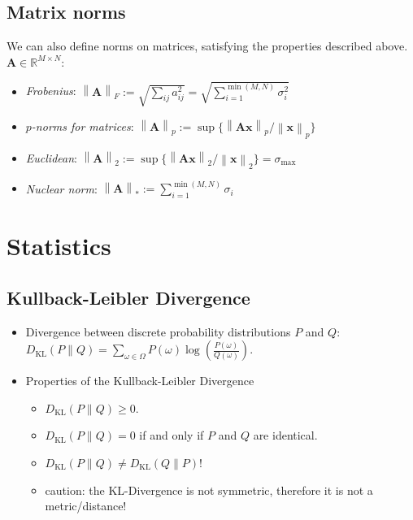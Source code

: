 \documentclass[11pt,a4paper,technote]{IEEEtran}
\newcommand{\norm}[1]{\left\lVert#1\right\rVert}
\newcommand{\matr}[1]{\boldsymbol{\mathbf{#1}}}
\newcommand{\vect}[1]{\boldsymbol{\mathbf{#1}}}
\newcommand{\R}{\mathbb{R}}
\begin{document}
\subsection*{Matrix norms}
We can also define norms on matrices, satisfying the properties described
above. $\matr{A} \in \R^{M \times N}$:
\begin{itemize}
  \item \emph{Frobenius}:
    \(
      \norm{\matr{A}}_F := \sqrt{\sum_{ij} a_{ij}^2}
      = \sqrt{\sum_{i=1}^{\min(M,N)} \sigma_i^2}
    \)

  \item \emph{$p$-norms for matrices}:
    \(
      \norm{\matr{A}}_p := \sup\{\norm{\matr{A}\vect{x}}_p/\norm{\vect{x}}_p\}
    \)
  \item \emph{Euclidean}:
    \(
      \norm{\matr{A}}_2 := \sup\{\norm{\matr{A}\vect{x}}_2/\norm{\vect{x}}_2\}
      = \sigma_{\max}
    \)
  \item \emph{Nuclear norm}:
    \(
      \norm{\matr{A}}_{*} := \sum_{i=1}^{\min(M,N)} \sigma_i
    \)

\end{itemize}

\section*{Statistics}
\subsection*{Kullback-Leibler Divergence}
\begin{itemize}
  \item Divergence between discrete probability distributions $P$ and $Q$:
    \(
      D_{\mathrm{KL}}(P \| Q) = \sum_{\omega \in \Omega} P(\omega)
      \log\left(\frac{P(\omega)}{Q(\omega)}\right).
    \)
  \item Properties of the Kullback-Leibler Divergence
    \begin{itemize}
      \item $D_{\mathrm{KL}}(P \| Q) \geq 0$.
      \item $D_{\mathrm{KL}}(P \| Q) = 0$ if and only if $P$ and $Q$ are
        identical.
      \item $D_{\mathrm{KL}}(P \| Q) \neq D_{\mathrm{KL}}(Q \| P)$!
      \item caution: the KL-Divergence is not symmetric, therefore it is not a
        metric/distance!
    \end{itemize}
\end{itemize}
\end{document}
